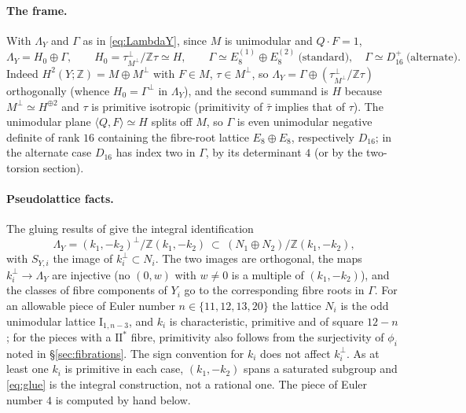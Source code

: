 \documentclass[12pt]{article}
\newcommand{\Z}{\mathbb Z}
\newcommand{\II}{\mathrm{II}}
\newcommand{\I}{\mathrm{I}}
\theoremstyle{definition}
\theoremstyle{remark}
\begin{document}
\paragraph{The frame.}
With \(\Lambda_Y\) and \(\Gamma\) as in \eqref{eq:LambdaY}, since
\(M\) is unimodular and \(Q\cdot F=1\),
\begin{equation}\label{eq:frame}
 \Lambda_Y=H_0\oplus\Gamma,\qquad H_0=\tau^\perp_{M^\perp}/\Z\tau\simeq H,
 \qquad
 \Gamma\simeq E_8^{(1)}\oplus E_8^{(2)}\ \text{(standard)},\quad
 \Gamma\simeq D_{16}^{+}\ \text{(alternate)}.
\end{equation}
Indeed
\(H^2(Y;\Z)=M\oplus M^\perp\) with \(F\in M\), \(\tau\in M^\perp\), so
\(\Lambda_Y=\Gamma\oplus(\tau^\perp_{M^\perp}/\Z\tau)\) orthogonally
(whence \(H_0=\Gamma^\perp\) in \(\Lambda_Y\)), and the second
summand is \(H\) because \(M^\perp\simeq H^{\oplus2}\) and \(\tau\) is
primitive isotropic (primitivity of \(\bar\tau\) implies that of
\(\tau\)). The unimodular plane \(\langle Q,F\rangle\simeq H\) splits
off \(M\), so \(\Gamma\) is even unimodular negative definite of rank
\(16\) containing the fibre-root lattice \(E_8\oplus E_8\), respectively
\(D_{16}\); in the alternate case \(D_{16}\) has index two in
\(\Gamma\), by its determinant \(4\) (or by the two-torsion section).

\paragraph{Pseudolattice facts.}
The gluing results of \cite[Propositions~4.18 and~4.20]{GT}
give the integral identification
\begin{equation}\label{eq:glue}
 \Lambda_Y=(k_1,-k_2)^\perp/\Z(k_1,-k_2)
 \ \subset\ (N_1\oplus N_2)/\Z(k_1,-k_2),
\end{equation}
with \(S_{Y,i}\) the image of \(k_i^\perp\subset N_i\). The two
images are orthogonal, the maps \(k_i^\perp\to\Lambda_Y\) are
injective (no \((0,w)\) with \(w\neq0\) is a multiple of
\((k_1,-k_2)\)), and the classes of fibre components of \(Y_i\) go to
the corresponding fibre roots in \(\Gamma\). For an allowable piece of
Euler number \(n\in\{11,12,13,20\}\) the lattice \(N_i\) is the odd
unimodular lattice \(\I_{1,n-3}\), and \(k_i\) is characteristic,
primitive and of square \(12-n\)
\cite[Theorems~2.18 and~4.10, Lemma~2.20]{GT}; for the pieces with a
\(\II^*\) fibre, primitivity also follows from the surjectivity of
\(\phi_i\) noted in \S\ref{sec:fibrations}. The sign convention for
\(k_i\) does not affect \(k_i^\perp\). As at least one \(k_i\) is
primitive in each case, \((k_1,-k_2)\) spans a saturated subgroup and
\eqref{eq:glue} is the integral construction, not a rational one. The
piece of Euler number \(4\) is computed by hand below.
\end{document}
